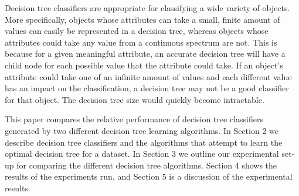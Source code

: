 \documentclass[12pt, letterpaper]{article}
\begin{document}
Decision tree classifiers are appropriate for classifying a wide variety of objects.  More
specifically, objects whose attributes can take a small, finite amount of values can easily
be represented in a decision tree, whereas objects whose attributes could take any value from
a continuous spectrum are not.  This is because for a given meaningful attribute, an accurate decision tree
will have a child node for each possible value that the attribute could take.  If an object's attribute could take one
of an infinite amount of values and each different value has an impact on the classification,
a decision tree may not be a good classifier for that object.  The decision tree size would quickly become intractable.


This paper compares the relative performance of decision tree classifiers generated by two
different decision tree learning algorithms. In Section 2 we describe decision tree classifiers and the
algorithms that attempt to learn the optimal decision tree for a dataset.  In Section 3 we outline our experimental
set-up for comparing the different decision tree algorithms. Section 4 shows the results of
the experiments run, and Section 5 is a discussion of the experimental results.   
\end{document}
